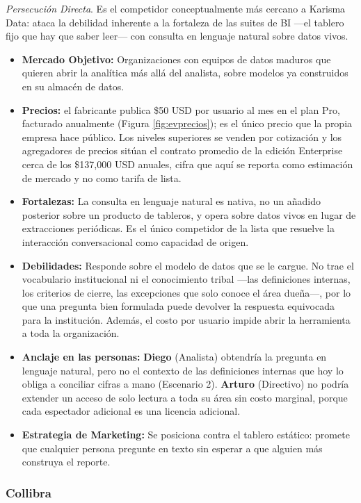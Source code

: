 \textit{Persecución Directa}. Es el competidor conceptualmente más cercano a Karisma Data: ataca la debilidad inherente a la fortaleza de las suites de BI —el tablero fijo que hay que saber leer— con consulta en lenguaje natural sobre datos vivos.
\begin{itemize}
    \item \textbf{Mercado Objetivo:} Organizaciones con equipos de datos maduros que quieren abrir la analítica más allá del analista, sobre modelos ya construidos en su almacén de datos.
    \item \textbf{Precios:} el fabricante publica \$50 USD por usuario al mes en el plan Pro, facturado anualmente (Figura \ref{fig:evprecios}); es el único precio que la propia empresa hace público. Los niveles superiores se venden por cotización y los agregadores de precios sitúan el contrato promedio de la edición Enterprise cerca de los \$137{,}000 USD anuales, cifra que aquí se reporta como estimación de mercado y no como tarifa de lista.
    \item \textbf{Fortalezas:} La consulta en lenguaje natural es nativa, no un añadido posterior sobre un producto de tableros, y opera sobre datos vivos en lugar de extracciones periódicas. Es el único competidor de la lista que resuelve la interacción conversacional como capacidad de origen.
    \item \textbf{Debilidades:} Responde sobre el modelo de datos que se le cargue. No trae el vocabulario institucional ni el conocimiento tribal —las definiciones internas, los criterios de cierre, las excepciones que solo conoce el área dueña—, por lo que una pregunta bien formulada puede devolver la respuesta equivocada para la institución. Además, el costo por usuario impide abrir la herramienta a toda la organización.
    \item \textbf{Anclaje en las personas:} \textbf{Diego} (Analista) obtendría la pregunta en lenguaje natural, pero no el contexto de las definiciones internas que hoy lo obliga a conciliar cifras a mano (Escenario 2). \textbf{Arturo} (Directivo) no podría extender un acceso de solo lectura a toda su área sin costo marginal, porque cada espectador adicional es una licencia adicional.
    \item \textbf{Estrategia de Marketing:} Se posiciona contra el tablero estático: promete que cualquier persona pregunte en texto sin esperar a que alguien más construya el reporte.
\end{itemize}

\clearpage
\subsubsection{Collibra}


